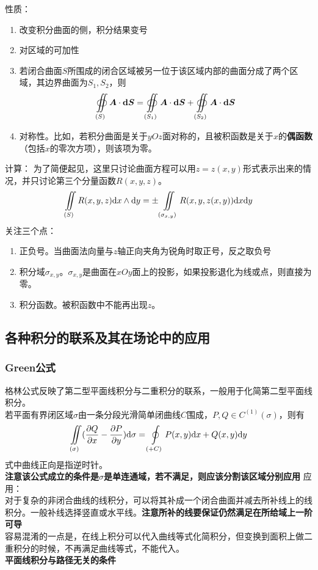性质：
\begin{enumerate}
	\item 改变积分曲面的侧，积分结果变号
	\item 对区域的可加性
	\item 若闭合曲面$S$所围成的闭合区域被另一位于该区域内部的曲面分成了两个区域，其边界曲面为$S_1,S_2$，则
	\begin{equation}\label{key}
		\oiint \limits_{(S)}\bm{A}\cdot \bm{\mathrm{d} S}=\oiint\limits_{(S_1)}\bm{A}\cdot \bm{\mathrm{d} S}+\oiint\limits_{(S_2)}\bm{A}\cdot \bm{\mathrm{d} S}
	\end{equation}
	\item 对称性。比如，若积分曲面是关于$yOz$面对称的，且被积函数是关于$x$的\textbf{偶函数}（包括$x$的零次方项），则该项为零。
\end{enumerate}
计算：
为了简便起见，这里只讨论曲面方程可以用$z=z(x,y)$形式表示出来的情况，并只讨论第三个分量函数$R(x,y,z)$。
\begin{equation}\label{key}
	\iint\limits_{(S)}R(x,y,z)\mathrm{d} x\wedge\mathrm{d} y=\pm \iint\limits_{(\sigma_{x,y})}R(x,y,z(x,y))\mathrm{d} x\mathrm{d} y
\end{equation}
关注三个点：
\begin{enumerate}
	\item 正负号。当曲面法向量与$z$轴正向夹角为锐角时取正号，反之取负号
	\item 积分域$\sigma_{x,y}$。$\sigma_{x,y}$是曲面在$xOy$面上的投影，如果投影退化为线或点，则直接为零。
	\item 积分函数。被积函数中不能再出现$z$。
\end{enumerate}

\subsection{各种积分的联系及其在场论中的应用}
\subsubsection{Green公式}
格林公式反映了第二型平面线积分与二重积分的联系，一般用于化简第二型平面线积分。\\
若平面有界闭区域$\sigma$由一条分段光滑简单闭曲线$C$围成，$P,Q\in C^{(1)}(\sigma)$，则有
\begin{equation}\label{key}
	\iint\limits_{(\sigma)}(\dfrac{\partial Q}{\partial x}-\dfrac{\partial P}{\partial y})\mathrm{d} \sigma =\oint \limits_{(+C)} P(x,y)\mathrm{d} x+Q(x,y)\mathrm{d} y
\end{equation}
式中曲线正向是指逆时针。\\
\textbf{注意\quad 该公式成立的条件是$\sigma$是单连通域，若不满足，则应该分割该区域分别应用}
应用：\\
对于复杂的非闭合曲线的线积分，可以将其补成一个闭合曲面并减去所补线上的线积分。一般补线选择竖直或水平线。\textbf{注意所补的线要保证仍然满足在所给域上一阶可导}\\
容易混淆的一点是，在线上积分可以代入曲线等式化简积分，但变换到面积上做二重积分的时候，不再满足曲线等式，不能代入。\\
\textbf{平面线积分与路径无关的条件}

